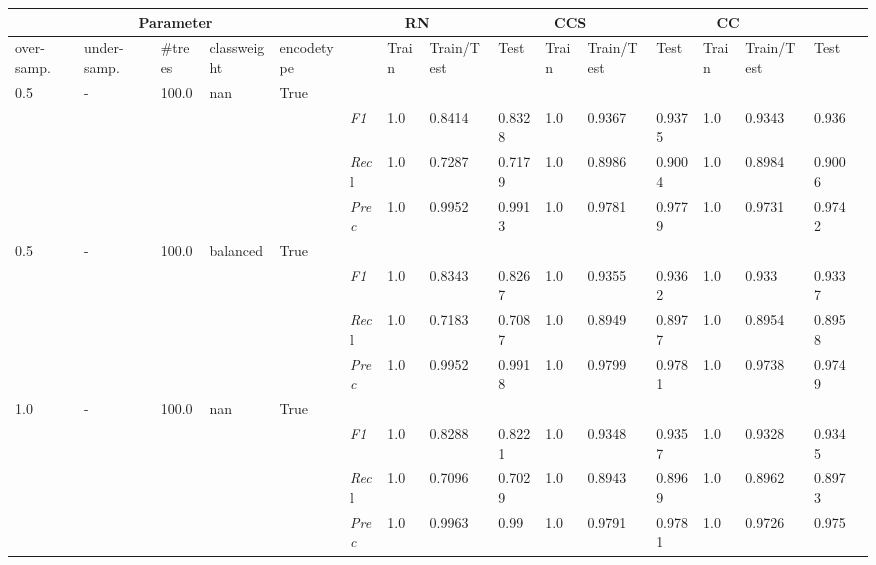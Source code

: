 \begin{table}[]
    \tiny
    \tabcolsep=0.11cm
    \begin{tabularx}{\textwidth}{XXXXX|X|XXX|XXX|XXXX}
    \toprule
    \multicolumn{5}{c}{Parameter} & \multicolumn{3}{c}{RN} & \multicolumn{3}{c}{CCS} & \multicolumn{3}{c}{CC} \\ \midrule
    over-\newline samp. & under-\newline samp. & \#trees & class\newline weight & encode\newline type & & Train & Train/\newline Test & Test & Train & Train/\newline Test & Test & Train & Train/\newline Test & Test \\ \midrule
    0.5 & - & 100.0 & nan & True& & & & & & & & & \\
    & & & & & \textit{F1} & 1.0 & 0.8414 & 0.8328 & 1.0 & 0.9367        & 0.9375        & 1.0        & 0.9343        & 0.936        \\
    & & & & & \textit{Rec}l & 1.0 & 0.7287 & 0.7179    & 1.0 & 0.8986    & 0.9004    & 1.0    & 0.8984    & 0.9006    \\
    & & & & & \textit{Prec} & 1.0 & 0.9952 & 0.9913 & 1.0 & 0.9781 & 0.9779 & 1.0 & 0.9731 & 0.9742 \\ \midrule
    0.5 & - & 100.0 & balanced & True& & & & & & & & & \\
    & & & & & \textit{F1} & 1.0 & 0.8343 & 0.8267 & 1.0 & 0.9355        & 0.9362        & 1.0        & 0.933        & 0.9337        \\
    & & & & & \textit{Rec}l & 1.0 & 0.7183 & 0.7087    & 1.0 & 0.8949    & 0.8977    & 1.0    & 0.8954    & 0.8958    \\
    & & & & & \textit{Prec} & 1.0 & 0.9952 & 0.9918 & 1.0 & 0.9799 & 0.9781 & 1.0 & 0.9738 & 0.9749 \\ \midrule
    1.0 & - & 100.0 & nan & True& & & & & & & & & \\
    & & & & & \textit{F1} & 1.0 & 0.8288 & 0.8221 & 1.0 & 0.9348        & 0.9357        & 1.0        & 0.9328        & 0.9345        \\
    & & & & & \textit{Rec}l & 1.0 & 0.7096 & 0.7029    & 1.0 & 0.8943    & 0.8969    & 1.0    & 0.8962    & 0.8973    \\
    & & & & & \textit{Prec} & 1.0 & 0.9963 & 0.99 & 1.0 & 0.9791 & 0.9781 & 1.0 & 0.9726 & 0.975 \\ \midrule

\end{tabularx}
\end{table}
